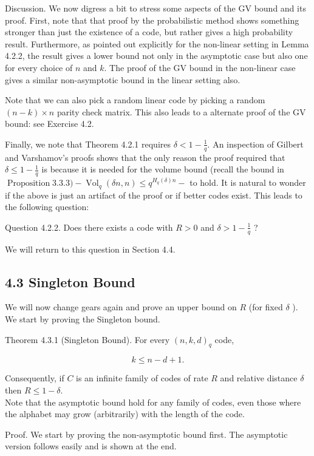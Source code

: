 \documentclass[10pt]{article}
\begin{document}
Discussion. We now digress a bit to stress some aspects of the GV bound and its proof. First, note that that proof by the probabilistic method shows something stronger than just the existence of a code, but rather gives a high probability result. Furthermore, as pointed out explicitly for the non-linear setting in Lemma 4.2.2, the result gives a lower bound not only in the asymptotic case but also one for every choice of $n$ and $k$. The proof of the GV bound in the non-linear case gives a similar non-asymptotic bound in the linear setting also.

Note that we can also pick a random linear code by picking a random $(n-k) \times n$ parity check matrix. This also leads to a alternate proof of the GV bound: see Exercise 4.2.

Finally, we note that Theorem 4.2.1 requires $\delta<1-\frac{1}{q}$. An inspection of Gilbert and Varshamov's proofs shows that the only reason the proof required that $\delta \leq 1-\frac{1}{q}$ is because it is needed for the volume bound (recall the bound in $\operatorname{Proposition} 3.3 .3)-\operatorname{Vol}_{q}(\delta n, n) \leq q^{H_{q}(\delta) n}-$ to hold. It is natural to wonder if the above is just an artifact of the proof or if better codes exist. This leads to the following question:

Question 4.2.2. Does there exists a code with $R>0$ and $\delta>1-\frac{1}{q}$ ?

We will return to this question in Section 4.4.

\subsection*{4.3 Singleton Bound}
We will now change gears again and prove an upper bound on $R$ (for fixed $\delta$ ). We start by proving the Singleton bound.

Theorem 4.3.1 (Singleton Bound). For every $(n, k, d)_{q}$ code,

$$
k \leq n-d+1 .
$$

Consequently, if $C$ is an infinite family of codes of rate $R$ and relative distance $\delta$ then $R \leq 1-\delta$.\\
Note that the asymptotic bound hold for any family of codes, even those where the alphabet may grow (arbitrarily) with the length of the code.

Proof. We start by proving the non-asymptotic bound first. The asymptotic version follows easily and is shown at the end.
\end{document}

